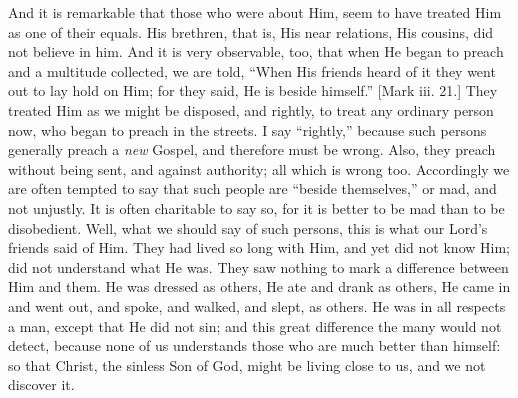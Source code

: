 And it is remarkable that those who were about Him, seem to have
treated Him as one of their equals. His brethren, that is, His near
relations, His cousins, did not believe in him. And it is very
observable, too, that when He began to preach and a multitude
collected, we are told, ``When His friends heard of it they went
out to lay hold on Him; for they said, He is beside himself.''
[Mark iii. 21.] They treated Him as we might be disposed, and rightly,
to treat any ordinary person now, who began to preach in the streets.
I say ``rightly,'' because such persons generally preach a \emph{new}
Gospel, and therefore must be wrong. Also, they preach without being
sent, and against authority; all which is wrong too. Accordingly we
are often tempted to say that such people are ``beside
themselves,'' or mad, and not unjustly. It is often charitable to
say so, for it is better to be mad than to be disobedient. Well, what
we should say of such persons, this is what our Lord's friends said
of Him. They had lived so long with Him, and yet did not know Him; did
not understand what He was. They saw nothing to mark a difference
between Him and them. He was dressed as others, He ate and drank as
others, He came in and went out, and spoke, and walked, and slept, as
others. He was in all respects a man, except that He did not sin; and
this great difference the many would not detect, because none of us
understands those who are much better than himself: so that Christ,
the sinless Son of God, might be living close to us, and we not
discover it.

